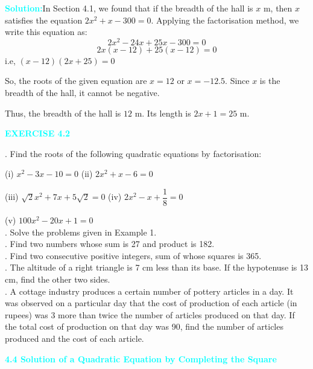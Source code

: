 \documentclass[a4paper,12pt]{article}
\begin{document}
\noindent\textcolor{cyan}{\textbf{Solution:}}In Section 4.1, we found that if the breadth of the hall is $x$ m, then $x$ satisfies the equation
$
2x^2 + x - 300 = 0.$
Applying the factorisation method, we write this equation as:
\[
2x^2 - 24x + 25x - 300 = 0
\]
\[
2x(x - 12) + 25(x - 12) = 0
\]
i.e, \hspace{12em}$
(x - 12)(2x + 25) = 0$

So, the roots of the given equation are $x = 12$ or $x = -12.5$. Since $x$ is the breadth of the hall, it cannot be negative.

Thus, the breadth of the hall is $12$ m. Its length is $2x + 1 = 25$ m.

\begin{center}
    \textcolor{cyan}{\textbf{EXERCISE 4.2}}
\end{center}

. Find the roots of the following quadratic equations by factorisation:

\hspace{1em}(i) $x^2 - 3x - 10 = 0$   \hspace{4em}(ii) $2x^2 + x - 6 = 0$ 

\hspace{1em}(iii) $\sqrt{2}x^2 + 7x + 5\sqrt{2} = 0$ 
\hspace{1em}(iv) $2x^2 - x + \dfrac{1}{8} = 0$ 

\hspace{1em}(v) $100x^2 - 20x + 1 = 0$ \\
. Solve the problems given in Example 1. \\
. Find two numbers whose sum is 27 and product is 182. \\
. Find two consecutive positive integers, sum of whose squares is 365. \\
. The altitude of a right triangle is 7 cm less than its base. If the hypotenuse is 13 cm, find the other two sides. \\
. A cottage industry produces a certain number of pottery articles in a day. It was observed on a particular day that the cost of production of each article (in rupees) was 3 more than twice the number of articles produced on that day. If the total cost of production on that day was 90, find the number of articles produced and the cost of each article.

\vspace{1em}
\noindent\textcolor{cyan}{\textbf{4.4 Solution of a Quadratic Equation by Completing the Square}}
\end{document}
